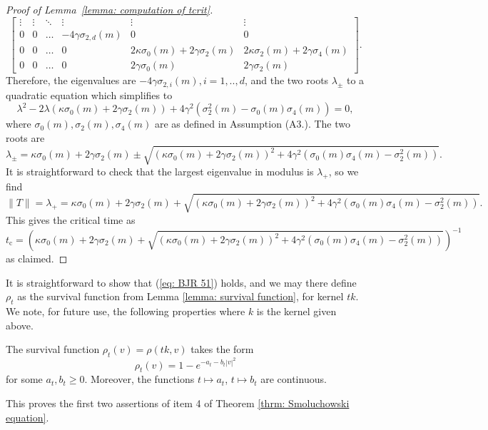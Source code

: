 \begin{proof}[Proof of Lemma~\ref{lemma: computation of tcrit}]
\begin{equation}
\begin{bmatrix}
    \vdots & \vdots  & \ddots & \vdots &\vdots & \vdots \\
    0 & 0&  \dots & -4\gamma \sigma_{2,d}(m) & 0 &0\\
    0&0   & \dots &0 & 2\kappa\sigma_0(m)+2\gamma\sigma_2(m) & 2\kappa\sigma_2(m)+2\gamma \sigma_4(m) \\ 
    0& 0 & \dots & 0& 2\gamma \sigma_0(m) & 2\gamma \sigma_2(m)
\end{bmatrix}.
   \end{equation} Therefore, the eigenvalues are $-4\gamma \sigma_{2,i}(m), i=1,..,d$, and the two roots  $\lambda_\pm$ to a quadratic equation which simplifies to \begin{equation}
       \lambda^2-2\lambda(\kappa\sigma_0(m)+2\gamma\sigma_2(m))+4\gamma^2(\sigma_2^2(m)-\sigma_0(m)\sigma_4(m))=0,
   \end{equation} 
   where $\sigma_0(m), \sigma_2(m), \sigma_4(m)$ are as defined in Assumption (A3.).
   The two roots are \begin{equation}
       \lambda_\pm=\kappa\sigma_0(m) +2\gamma\sigma_2(m) \pm \sqrt{(\kappa\sigma_0(m)+2\gamma\sigma_2(m))^2+4\gamma^2(\sigma_0(m)\sigma_4(m)-\sigma_2^2(m))}.
   \end{equation} It is straightforward to check that the largest eigenvalue in modulus is $\lambda_+$, so we find \begin{equation}
       \|T\|=\lambda_+=\kappa\sigma_0(m) +2\gamma\sigma_2(m) + \sqrt{(\kappa\sigma_0(m)+2\gamma\sigma_2(m))^2+4\gamma^2(\sigma_0(m)\sigma_4(m)-\sigma_2^2(m))}.
   \end{equation} This gives the critical time as \begin{equation}
       t_\text{c}= \left(\kappa\sigma_0(m) +2\gamma\sigma_2(m) + \sqrt{(\kappa\sigma_0(m)+2\gamma\sigma_2(m))^2+4\gamma^2(\sigma_0(m)\sigma_4(m)-\sigma_2^2(m))}\right)^{-1}
   \end{equation} as claimed.\end{proof}
It is straightforward to show that (\ref{eq: BJR 51}) holds, and we may there define $\rho_t$ as the survival function from Lemma \ref{lemma: survival function}, for kernel $tk$. We note, for future use, the following properties where $k$ is the kernel given above.
\begin{lemma}\label{lemma: form of rho-t}
    The survival function $\rho_t(v)=\rho(tk,v)$ takes the form \begin{equation}
        \rho_t(v)=1-e^{-a_t-b_t|v|^2}
    \end{equation} for some $a_t, b_t \ge 0$. Moreover, the functions $t\mapsto a_t$, $t\mapsto b_t$ are continuous.
\end{lemma} This proves the first two assertions of item 4 of Theorem \ref{thrm: Smoluchowski equation}.
